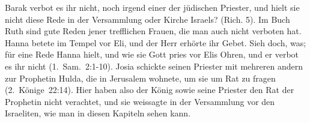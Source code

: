 {    Barak verbot es ihr nicht, noch irgend einer der jüdischen Priester, und
    hielt sie nicht diese Rede in der Versammlung oder Kirche 
    Israels? (Rich. 5). Im Buch Ruth sind 
    gute Reden jener trefflichen Frauen, die man auch nicht verboten hat. Hanna betete
    im Tempel vor Eli, und der Herr erhörte ihr Gebet. Sieh doch,
    was; für eine Rede Hanna hielt, und wie sie Gott pries vor Elis
    Ohren, und er verbot es ihr nicht 
    (1.~Sam.~2:1-10). Josia
    schickte seinen Priester mit mehreren andern zur Prophetin Hulda,
    die in Jerusalem wohnete, um sie um Rat zu fragen 
    (2.~Könige~22:14). 
    Hier haben also der König sowie seine Priester
    den Rat der Prophetin nicht verachtet, und sie weissagte 
    in der Versammlung vor den Israeliten, wie man in diesen
    Kapiteln sehen kann.

}
